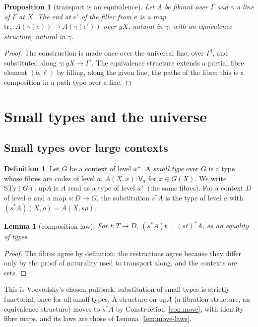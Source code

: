 \documentclass[11pt]{article}
\newcommand{\I}{\mathbb{I}}
\newcommand{\V}{\mathsf{V}}
\newcommand{\STy}{\mathrm{STy}}
\newcommand{\up}{\mathrm{up}}
\theoremstyle{plain}
\newtheorem{lemma}[theorem]{Lemma}
\newtheorem{proposition}[theorem]{Proposition}
\theoremstyle{definition}
\newtheorem{definition}[theorem]{Definition}
\theoremstyle{remark}
\begin{document}
\begin{proposition}[transport is an equivalence]\label{prop:transport}
Let $A$ be fibrant over $\Gamma$ and $\gamma$ a line of $\Gamma$ at $X$.
The end at $e'$ of the filler from $e$ is a map
$\mathrm{tr}_\gamma:A(\gamma(e))\to A(\gamma(e'))$ over $yX$, natural in
$\gamma$, with an equivalence structure, natural in $\gamma$.
\end{proposition}

\begin{proof}
The construction is made once over the universal line, over $\Gamma^\I$,
and substituted along $\gamma:yX\to\Gamma^\I$. The equivalence structure
extends a partial fibre element $(b,\ell)$ by filling, along the given
line, the paths of the fibre; this is a composition in a path type over
a line.
\end{proof}

\section{Small types and the universe}\label{sec:univ}

\subsection{Small types over large contexts}

\begin{definition}
Let $G$ be a context of level $a^+$. A \emph{small type} over $G$ is a
type whose fibres are codes of level $a$: $A(X,x):\V_a$ for $x\in G(X)$.
We write $\STy(G)$; $\up A$ is $A$ read as a type of level $a^+$ (the
same fibres). For a context $D$ of level $a$ and a map $s:D\to G$, the
substitution $s^*A$ is the type of level $a$ with
$(s^*A)(X,\rho)=A(X,s\rho)$.
\end{definition}

\begin{lemma}[composition law]\label{lem:xsub-o}
For $t:T\to D$, $(s^*A)t=(st)^*A$, as an equality of types.
\end{lemma}

\begin{proof}
The fibres agree by definition; the restrictions agree because they
differ only by the proof of naturality used to transport along, and the
contexts are sets.
\end{proof}

This is Voevodsky's chosen pullback: substitution of small types is
strictly functorial, once for all small types. A structure on $\up A$
(a fibration structure, an equivalence structure) moves to $s^*A$ by
Construction~\ref{con:move}, with identity fibre maps, and its laws are
those of Lemma~\ref{lem:move-laws}.
\end{document}
